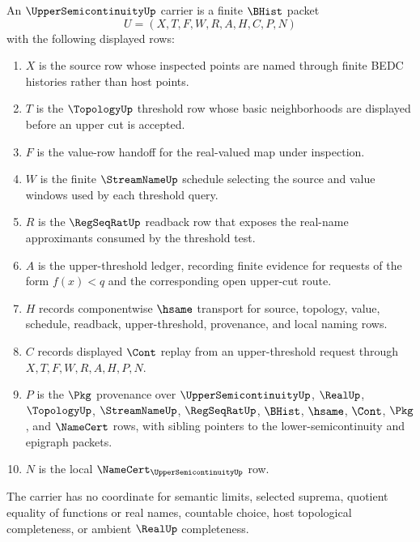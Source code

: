 \begin{definition}
\label{def:upper-semicontinuity-carrier}
An $\UpperSemicontinuityUp$ carrier is a finite $\BHist$ packet
$$
U=(X,T,F,W,R,A,H,C,P,N)
$$
with the following displayed rows:
\begin{enumerate}
\item $X$ is the source row whose inspected points are named through finite BEDC histories rather than host points.
\item $T$ is the $\TopologyUp$ threshold row whose basic neighborhoods are displayed before an upper cut is accepted.
\item $F$ is the value-row handoff for the real-valued map under inspection.
\item $W$ is the finite $\StreamNameUp$ schedule selecting the source and value windows used by each threshold query.
\item $R$ is the $\RegSeqRatUp$ readback row that exposes the real-name approximants consumed by the threshold test.
\item $A$ is the upper-threshold ledger, recording finite evidence for requests of the form $f(x)<q$ and the corresponding open upper-cut route.
\item $H$ records componentwise $\hsame$ transport for source, topology, value, schedule, readback, upper-threshold, provenance, and local naming rows.
\item $C$ records displayed $\Cont$ replay from an upper-threshold request through $X,T,F,W,R,A,H,P,N$.
\item $P$ is the $\Pkg$ provenance over $\UpperSemicontinuityUp$, $\RealUp$, $\TopologyUp$, $\StreamNameUp$, $\RegSeqRatUp$, $\BHist$, $\hsame$, $\Cont$, $\Pkg$, and $\NameCert$ rows, with sibling pointers to the lower-semicontinuity and epigraph packets.
\item $N$ is the local $\NameCert_{\UpperSemicontinuityUp}$ row.
\end{enumerate}
The carrier has no coordinate for semantic limits, selected suprema, quotient equality of functions or real names, countable choice, host topological completeness, or ambient $\RealUp$ completeness.
\end{definition}

